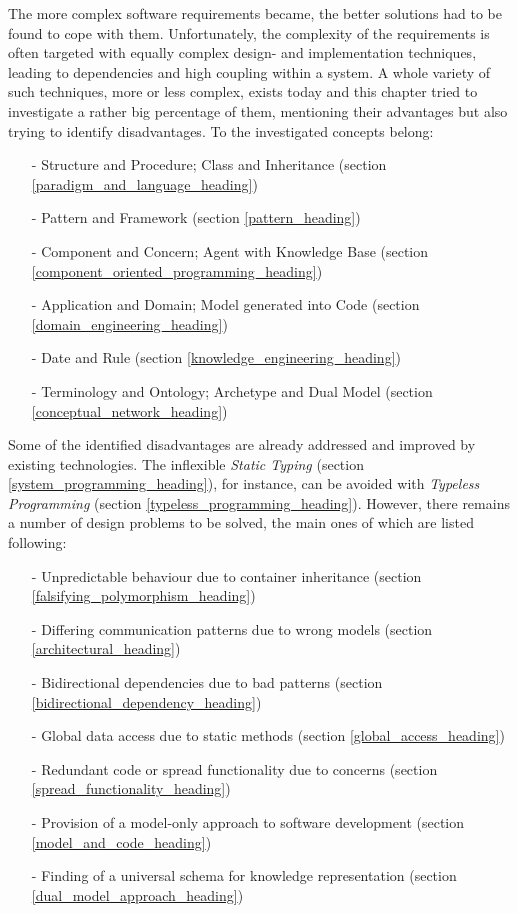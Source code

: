 The more complex software requirements became, the better solutions had to be
found to cope with them. Unfortunately, the complexity of the requirements is
often targeted with equally complex design- and implementation techniques,
leading to dependencies and high coupling within a system. A whole variety of
such techniques, more or less complex, exists today and this chapter tried to
investigate a rather big percentage of them, mentioning their advantages but
also trying to identify disadvantages. To the investigated concepts belong:

\begin{itemize}
    \item[-] Structure and Procedure; Class and Inheritance (section \ref{paradigm_and_language_heading})
    \item[-] Pattern and Framework (section \ref{pattern_heading})
    \item[-] Component and Concern; Agent with Knowledge Base (section \ref{component_oriented_programming_heading})
    \item[-] Application and Domain; Model generated into Code (section \ref{domain_engineering_heading})
    \item[-] Date and Rule (section \ref{knowledge_engineering_heading})
    \item[-] Terminology and Ontology; Archetype and Dual Model (section \ref{conceptual_network_heading})
\end{itemize}

Some of the identified disadvantages are already addressed and improved by
existing technologies. The inflexible \emph{Static Typing} (section
\ref{system_programming_heading}), for instance, can be avoided with
\emph{Typeless Programming} (section \ref{typeless_programming_heading}).
However, there remains a number of design problems to be solved, the main ones
of which are listed following:

\begin{itemize}
    \item[-] Unpredictable behaviour due to container inheritance
        (section \ref{falsifying_polymorphism_heading})
    \item[-] Differing communication patterns due to wrong models
        (section \ref{architectural_heading})
    \item[-] Bidirectional dependencies due to bad patterns
        (section \ref{bidirectional_dependency_heading})
    \item[-] Global data access due to static methods
        (section \ref{global_access_heading})
    \item[-] Redundant code or spread functionality due to concerns
        (section \ref{spread_functionality_heading})
    \item[-] Provision of a model-only approach to software development
        (section \ref{model_and_code_heading})
    \item[-] Finding of a universal schema for knowledge representation
        (section \ref{dual_model_approach_heading})
\end{itemize}

